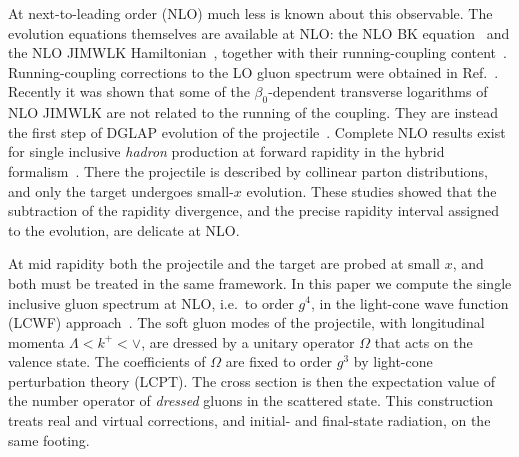 At next-to-leading order (NLO) much less is known about this observable. The evolution equations themselves are available at NLO: the NLO BK equation~\cite{Balitsky:2007feb} and the NLO JIMWLK Hamiltonian~\cite{Balitsky:2013fea,Kovner:2013ona,Kovner:2014lca,Lublinsky:2016meo}, together with their running-coupling content~\cite{Balitsky:2006wa,Kovchegov:2006vj}. Running-coupling corrections to the LO gluon spectrum were obtained in Ref.~\cite{Horowitz:2010yg}. Recently it was shown that some of the $\beta_0$-dependent transverse logarithms of NLO JIMWLK are not related to the running of the coupling. They are instead the first step of DGLAP evolution of the projectile~\cite{Kovner:2023vsy,Altinoluk:2023hfz}. Complete NLO results exist for single inclusive \emph{hadron} production at forward rapidity in the hybrid formalism~\cite{Chirilli:2011km,Chirilli:2012jd,Stasto:2013cha,Altinoluk:2014eka,Ducloue:2016shw,Iancu:2016vyg}. There the projectile is described by collinear parton distributions, and only the target undergoes small-$x$ evolution. These studies showed that the subtraction of the rapidity divergence, and the precise rapidity interval assigned to the evolution, are delicate at NLO.

At mid rapidity both the projectile and the target are probed at small $x$, and both must be treated in the same framework. In this paper we compute the single inclusive gluon spectrum at NLO, i.e.\ to order $g^4$, in the light-cone wave function (LCWF) approach~\cite{Lepage:1980fj,Brodsky:1997de,Kovner:2005nq,Kovner:2013ona,Kovner:2014lca,Lublinsky:2016meo}. The soft gluon modes of the projectile, with longitudinal momenta $\Lambda<k^+<\vee$, are dressed by a unitary operator $\Omega$ that acts on the valence state. The coefficients of $\Omega$ are fixed to order $g^3$ by light-cone perturbation theory (LCPT). The cross section is then the expectation value of the number operator of \emph{dressed} gluons in the scattered state. This construction treats real and virtual corrections, and initial- and final-state radiation, on the same footing.

